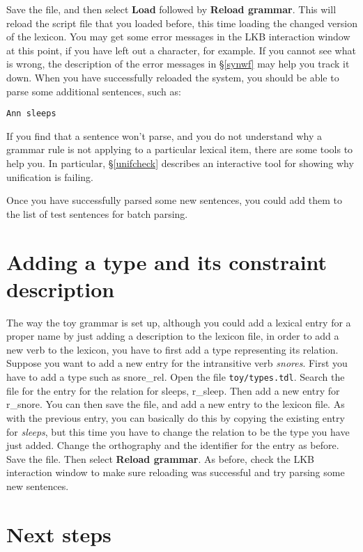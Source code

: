 \documentclass[12pt]{report}
\newcommand{\filename}[1]{{\tt #1}}
\newcommand{\lkbmenucommand}{\bf}
\begin{document}
Save the file, and then select {\lkbmenucommand Load}
followed by {\lkbmenucommand Reload grammar}.  This will reload the script file that
you loaded before, this time loading the changed version of the lexicon.
You may get some error messages in the LKB interaction window
at this point, if you have left
out a character, for example.  If you cannot see what is wrong, the
description of the error messages in \S\ref{synwf} may help you
track it down.  When you have successfully reloaded the system,
you should be able to parse some additional sentences, such as:
\begin{verbatim}
Ann sleeps
\end{verbatim}
If you find that a sentence won't parse, and you do not understand
why a grammar rule is not applying to a particular lexical
item, there are some tools to help you.  In particular,
\S\ref{unifcheck} describes an interactive tool for 
showing why unification is failing.

Once you have successfully parsed some new sentences,
you could add them to the list of test sentences for batch parsing.

\section{Adding a type and its constraint description}

The way the toy grammar is set up, although you could add a lexical
entry for a proper name by just adding a description to the lexicon file,
in order to add a new verb to the lexicon, you have to first add a type
representing its relation.  Suppose you want to add a new entry for
the intransitive verb {\it snores}.  First you have to add a type such as
{\type snore\_rel}.  Open the file \filename{toy/types.tdl}.  Search the file for
the entry for the relation for sleeps, {\type r\_sleep}.  Then add a new
entry for {\type r\_snore}.  You can then save the file, and add a new entry
to the lexicon file.  As with the previous entry, you can basically do
this by copying the existing entry for {\it sleeps},
but this time you have to 
change the relation to be the type you have just added.
Change the orthography and the identifier for the entry as before.
Save the file.  Then select {\lkbmenucommand Reload grammar}.  As before, check
the LKB interaction window to make sure reloading was successful 
and try parsing
some new sentences.


\section{Next steps}
\end{document}
